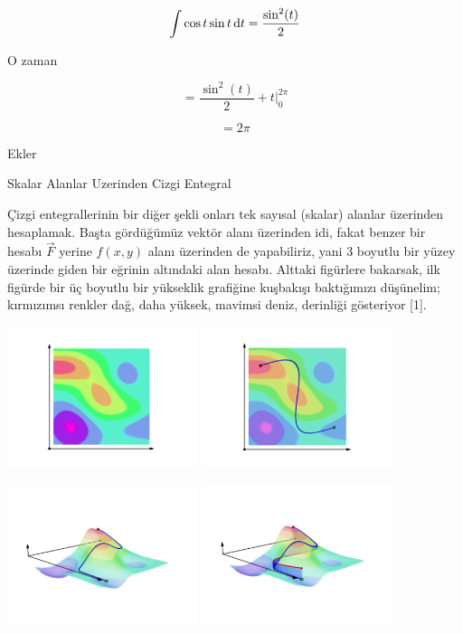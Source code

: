 \documentclass[12pt,fleqn]{article}\usepackage{../../common}
\begin{document}
$$ \int \cos t \sin t \,\mathrm{d} t = \frac{\sin^2(t)}{2} $$

O zaman 

$$ = \frac{\sin^2(t)}{2} + t \bigg|_0^{2\pi}  $$

$$ =  2\pi $$

Ekler

Skalar Alanlar Uzerinden Cizgi Entegral

Çizgi entegrallerinin bir diğer şekli onları tek sayısal (skalar) alanlar
üzerinden hesaplamak. Başta gördüğümüz vektör alanı üzerinden idi, fakat
benzer bir hesabı $\vec{F}$ yerine $f(x,y)$ alanı üzerinden de yapabiliriz,
yani 3 boyutlu bir yüzey üzerinde giden bir eğrinin altındaki alan
hesabı. Alttaki figürlere bakarsak, ilk figürde bir üç boyutlu bir
yükseklik grafiğine kuşbakışı baktığımızı düşünelim; kırmızımsı renkler
dağ, daha yüksek, mavimsi deniz, derinliği gösteriyor [1]. 

\includegraphics[width=15em]{19_line_ex1_01.png}
\includegraphics[width=15em]{19_line_ex1_02.png}

\includegraphics[width=15em]{19_line_ex1_03.png}
\includegraphics[width=15em]{19_line_ex1_04.png}
\end{document}
